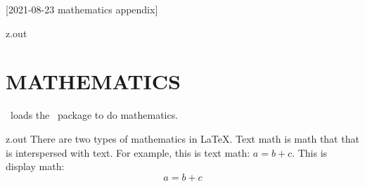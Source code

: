 [2021-08-23 mathematics appendix]

\begin{VerbatimOut}{z.out}
\chapter{MATHEMATICS}

\PurdueThesisLogo\ loads the \AMSmathLogo\ package \cite{amslatex3project2019}
to do mathematics.
\end{VerbatimOut}

\MyIO


\begin{VerbatimOut}{z.out}
There are two types of mathematics in \LaTeX.
Text math is math that that is interspersed with text.
For example, this is text math: \(a = b + c\).
This is display math:
\begin{equation}
  a = b + c
\end{equation}
\end{VerbatimOut}

\MyIO


